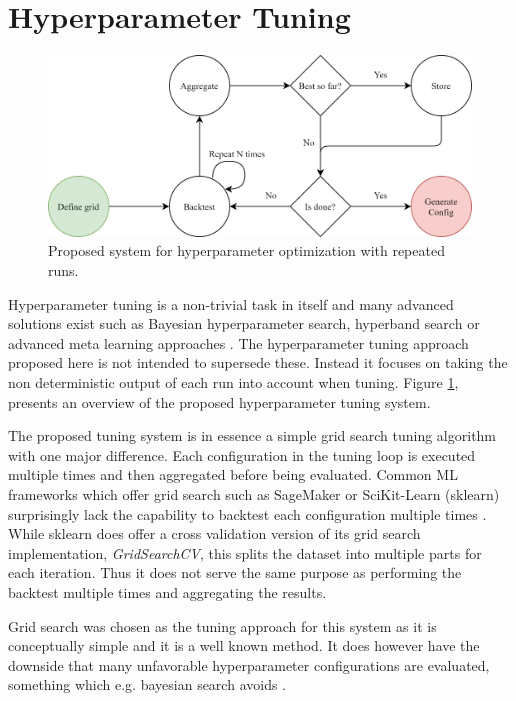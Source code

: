 \section{Hyperparameter Tuning}
\label{sec:hpo}
\begin{figure}[h]
  \centering
  \includegraphics[width=\linewidth]{./img/tuning_overview.png}
  \caption{Proposed system for hyperparameter optimization with repeated runs.}
  \label{fig:proposed_hyperparameter_tuning}
\end{figure}
Hyperparameter tuning is a non-trivial task in itself and many advanced solutions exist such as Bayesian hyperparameter search, hyperband search or advanced meta learning approaches \cite{snoek2012practical,feurer2019hyperparameter, li2017hyperband}. The hyperparameter tuning approach proposed here is not intended to supersede these. Instead it focuses on taking the non deterministic output of each run into account when tuning. Figure \ref{fig:proposed_hyperparameter_tuning}, presents an overview of the proposed hyperparameter tuning system.

The proposed tuning system is in essence a simple grid search tuning algorithm with one major difference. Each configuration in the tuning loop is executed multiple times and then aggregated before being evaluated. Common ML frameworks which offer grid search such as SageMaker or SciKit-Learn (sklearn) surprisingly lack the capability to backtest each configuration multiple times \cite{sagemaker_website, scikit-learn}. While sklearn does offer a cross validation version of its grid search implementation, \textit{GridSearchCV}, this splits the dataset into multiple parts for each iteration. Thus it does not serve the same purpose as performing the backtest multiple times and aggregating the results.

Grid search was chosen as the tuning approach for this system as it is conceptually simple and it is a well known method. It does however have the downside that many unfavorable hyperparameter configurations are evaluated, something which e.g. bayesian search avoids \cite{snoek2012practical}.


